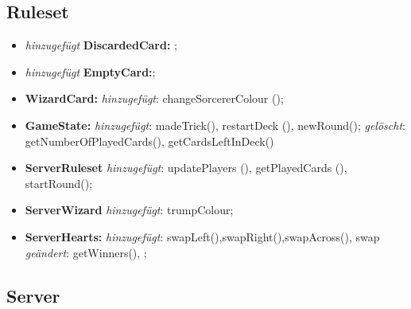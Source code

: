 \documentclass{article}
\begin{document}
\subsection{Ruleset}

\begin{itemize}
\item \textit{hinzugefügt} \textbf{DiscardedCard:} ;

\item \textit{hinzugefügt} \textbf{EmptyCard:};

\item \textbf{WizardCard:} \textit{hinzugefügt}: changeSorcererColour ();

\item \textbf{GameState:} \textit{hinzugefügt}: madeTrick(), restartDeck (), newRound(); \textit{gelöscht}: getNumberOfPlayedCards(), getCardsLeftInDeck()

\item \textbf{ServerRuleset} \textit{hinzugefügt}: updatePlayers (), getPlayedCards (), startRound(); 

\item \textbf{ServerWizard} \textit{hinzugefügt}: trumpColour; 

\item \textbf{ServerHearts:} \textit{hinzugefügt}: swapLeft(),swapRight(),swapAcross(), swap
\textit{geändert}: getWinners(),  ;
\end{itemize}

\subsection{Server}
\end{document}
